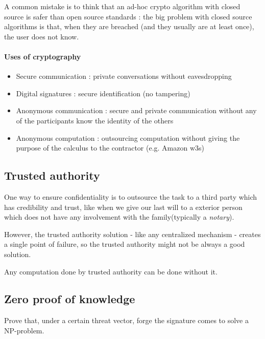A common mistake is to think that an ad-hoc crypto algorithm with closed source is safer than open source standards : the big problem with closed source algorithms is that, when they are breached (and they usually are at least once), the user does not know.

\paragraph{Uses of cryptography}
\begin{itemize}
		\item Secure communication : private conversations without eavesdropping 
		\item Digital signatures : secure identification (no tampering)
		\item Anonymous communication : secure and private communication without any of the participants know the identity of the others  
		\item Anonymous computation : outsourcing computation without giving the purpose of the calculus to the contractor (e.g. Amazon w3s)\\
\end{itemize}

\subsection{Trusted authority}

One way to ensure confidentiality is to outsource the task to a third party which has credibility and trust, like when we give our last will to a exterior person which does not have any involvement with the family(typically a \emph{notary}).

However, the trusted authority solution - like any centralized mechanism -  creates a single point of failure, so the trusted authority might not be always a good solution. \\

\begin{mytheorem}
Any computation done by trusted authority can be done without it.
\end{mytheorem}


\subsection{ Zero proof of knowledge }

\begin{mydef} 
Prove that, under a certain threat vector, forge the signature comes to solve a NP-problem. \\
\end{mydef}

